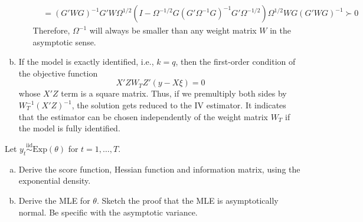 \documentclass[answers]{exam}
\begin{document}
\begin{questions}
\begin{solution}
\begin{enumerate}[a)]
\begin{itemize}
\begin{align}
          &= \left(G'WG\right)^{-1}G'W\Omega^{1/2}\left(I-\Omega^{-1/2}G\left(G'\Omega^{-1}G\right)^{-1}G'\Omega^{-1/2}\right)\Omega^{1/2}WG\left(G'WG\right)^{-1} \succ 0
        \end{align}
        Therefore, $\Omega^{-1}$ will always be smaller than any weight matrix $W$ in the asymptotic sense.
      \end{itemize}
      \item If the model is exactly identified, i.e., $k=q$, then the first-order condition of the objective function
      \begin{equation}
        X'ZW_{T}Z'\left(y-X\xi\right)=0
      \end{equation}
      whose $X'Z$ term is a square matrix. Thus, if we premultiply both sides by $W_{T}^{-1}\left(X'Z\right)^{-1}$, the solution gets reduced to the IV estimator. It indicates that the estimator can be chosen independently of the weight matrix $W_{T}$ if the model is fully identified.
    \end{enumerate}
  \end{solution}
  \question
  Let $y_{t}\overset{\text{iid}}{\sim}\mathrm{Exp}\left(\theta\right)$ for $t=1,\ldots,T$.
  \begin{enumerate}[a)]
    \item Derive the score function, Hessian function and information matrix, using the exponential density.
    \item Derive the MLE for $\theta$. Sketch the proof that the MLE is asymptotically normal. Be specific with the asymptotic variance.
  \end{enumerate}
  \begin{solution}

\end{solution}
\end{questions}
\end{document}
